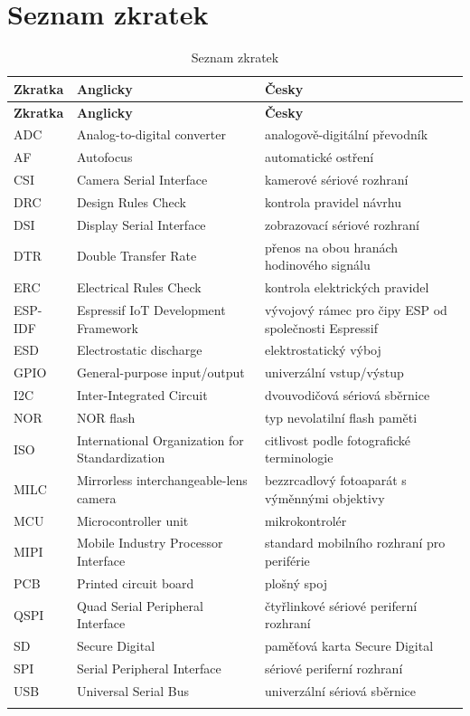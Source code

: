 \documentclass[12pt, a4paper, oneside]{report}
\begin{document}
\chapter*{Seznam zkratek}
\begingroup
\setlength{\tabcolsep}{6pt}
\renewcommand{\arraystretch}{1.4}
\begin{longtable}{>{\raggedright\arraybackslash}p{2.6cm} >{\raggedright\arraybackslash}p{6.3cm} >{\raggedright\arraybackslash}p{5.2cm}}

\textbf{Zkratka} & \textbf{Anglicky} & \textbf{Česky} \\
\endfirsthead
\textbf{Zkratka} & \textbf{Anglicky} & \textbf{Česky} \\
\endhead
ADC & Analog-to-digital converter & analogově-digitální převodník \\
AF & Autofocus & automatické ostření \\
CSI & Camera Serial Interface & kamerové sériové rozhraní \\
DRC & Design Rules Check & kontrola pravidel návrhu \\
DSI & Display Serial Interface & zobrazovací sériové rozhraní \\
DTR & Double Transfer Rate & přenos na obou hranách hodinového signálu \\
ERC & Electrical Rules Check & kontrola elektrických pravidel \\
ESP-IDF & Espressif IoT Development Framework & vývojový rámec pro čipy ESP od společnosti Espressif \\
ESD & Electrostatic discharge & elektrostatický výboj \\
GPIO & General-purpose input/output & univerzální vstup/výstup \\
I2C & Inter-Integrated Circuit & dvouvodičová sériová sběrnice \\
NOR & NOR flash & typ nevolatilní flash paměti \\
ISO & International Organization for Standardization & citlivost podle fotografické terminologie \\
MILC & Mirrorless interchangeable-lens camera & bezzrcadlový fotoaparát s výměnnými objektivy \\
MCU & Microcontroller unit & mikrokontrolér \\
MIPI & Mobile Industry Processor Interface & standard mobilního rozhraní pro periférie \\
PCB & Printed circuit board & plošný spoj \\
QSPI & Quad Serial Peripheral Interface & čtyřlinkové sériové periferní rozhraní \\
SD & Secure Digital & paměťová karta Secure Digital \\
SPI & Serial Peripheral Interface & sériové periferní rozhraní \\
USB & Universal Serial Bus & univerzální sériová sběrnice \\
\caption{Seznam zkratek}
\end{longtable}
\endgroup
\end{document}
